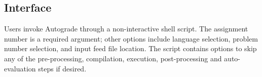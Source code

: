 \subsection{Interface}

Users invoke Autograde through a non-interactive shell script.  The assignment
number is a required argument; other options include language selection,
problem number selection, and input feed file location.   The script contains
options to skip any of the pre-processing, compilation, execution,
post-processing and auto-evaluation steps if desired.

